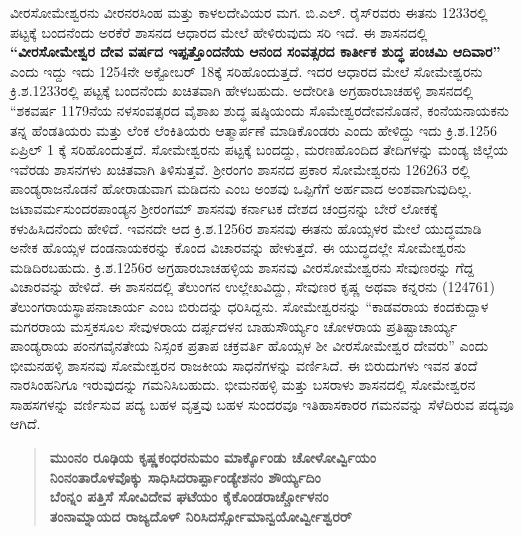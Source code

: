 ವೀರಸೋಮೇಶ್ವರನು ವೀರನರಸಿಂಹ ಮತ್ತು ಕಾಳಲದೇವಿಯರ ಮಗ. ಬಿ.ಎಲ್​. ರೈಸ್​ರವರು ಈತನು 1233ರಲ್ಲಿ ಪಟ್ಟಕ್ಕೆ ಬಂದನೆಂದು ಅರಕೆರೆ ಶಾಸನದ ಆಧಾರದ ಮೇಲೆ ಹೇಳಿರುವುದು ಸರಿ ಇದೆ. ಈ ಶಾಸನದಲ್ಲಿ \textbf{“ವೀರಸೋಮೇಶ್ವರ ದೇವ ವರ್ಷದ ಇಪ್ಪತ್ತೊಂದನೆಯ ಆನಂದ ಸಂವತ್ಸರದ ಕಾರ್ತೀಕ ಶುದ್ಧ ಪಂಚಮಿ ಆದಿವಾರ”} ಎಂದು ಇದ್ದು ಇದು 1254ನೇ ಅಕ್ಟೋಬರ್​ 18ಕ್ಕೆ ಸರಿಹೊಂದುತ್ತದೆ. ಇದರ ಆಧಾರದ ಮೇಲೆ ಸೋಮೇಶ್ವರನು ಕ್ರಿ.ಶ.1233ರಲ್ಲಿ ಪಟ್ಟಕ್ಕೆ ಬಂದನೆಂದು ಖಚಿತವಾಗಿ ಹೇಳಬಹುದು. ಅದೇರೀತಿ ಅಗ್ರಹಾರಬಾಚಹಳ್ಳಿ ಶಾಸನದಲ್ಲಿ “ಶಕವರ್ಷ 1179ನೆಯ ನಳಸಂವತ್ಸರದ ವೈಶಾಖ ಶುದ್ಧ ಷಷ್ಠಿಯಂದು ಸೊಮೇಶ್ವರದೇವನೊಡನೆ, ಕಂನೆಯನಾಯಕನು ತನ್ನ ಹೆಂಡತಿಯರು ಮತ್ತು ಲೆಂಕ ಲೆಂಕಿತಿಯರು ಆತ್ಮಾರ್ಪಣೆ ಮಾಡಿಕೊಂಡರು ಎಂದು ಹೇಳಿದ್ದು ಇದು ಕ್ರಿ.ಶ.1256 ಏಪ್ರಿಲ್​ 1 ಕ್ಕೆ ಸರಿಹೊಂದುತ್ತದೆ. ಸೋಮೇಶ್ವರನು ಪಟ್ಟಕ್ಕೆ ಬಂದದ್ದು, ಮರಣಹೊಂದಿದ ತೇದಿಗಳನ್ನು ಮಂಡ್ಯ ಜಿಲ್ಲೆಯ ಇವೆರಡು ಶಾಸನಗಳು ಖಚಿತವಾಗಿ ತಿಳಿಸುತ್ತವೆ. ಶ‍್ರೀರಂಗಂ ಶಾಸನದ ಪ್ರಕಾರ ಸೋಮೇಶ್ವರನು 126263 ರಲ್ಲಿ ಪಾಂಡ್ಯರಾಜನೊಡನೆ ಹೋರಾಡುವಾಗ ಮಡಿದನು ಎಂಬ ಅಂಶವು ಒಪ್ಪಿಗೆಗೆ ಅರ್ಹವಾದ ಅಂಶವಾಗುವುದಿಲ್ಲ. ಜಟಾವರ್ಮಸುಂದರಪಾಂಡ್ಯನ ಶ‍್ರೀರಂಗಮ್ ಶಾಸನವು ಕರ್ನಾಟಕ ದೇಶದ ಚಂದ್ರನನ್ನು ಬೇರೆ ಲೋಕಕ್ಕೆ ಕಳುಹಿಸಿದನೆಂದು ಹೇಳಿದೆ. ಇವನದೇ ಆದ ಕ್ರಿ.ಶ.1256ರ ಶಾಸನವು ಈತನು ಹೊಯ್ಸಳರ ಮೇಲೆ ಯುದ್ಧಮಾಡಿ ಅನೇಕ ಹೊಯ್ಸಳ ದಂಡನಾಯಕರನ್ನು ಕೊಂದ ವಿಚಾರವನ್ನು ಹೇಳುತ್ತದೆ. ಈ ಯುದ್ಧದಲ್ಲೇ ಸೋಮೇಶ್ವರನು ಮಡಿದಿರಬಹುದು. ಕ್ರಿ.ಶ.1256ರ ಅಗ್ರಹಾರಬಾಚಹಳ್ಳಿಯ ಶಾಸನವು ವೀರಸೋಮೇಶ್ವರನು ಸೇವುಣರನ್ನು ಗೆದ್ದ ವಿಚಾರವನ್ನು ಹೇಳಿದೆ. ಈ ಶಾಸನದಲ್ಲಿ ತೆಲುಂಗನ ಉಲ್ಲೇಖವಿದ್ದು, ಸೇವುಣರ ಕೃಷ್ಣ ಅಥವಾ ಕನ್ನರನು (124761) ತೆಲುಂಗರಾಯಸ್ಥಾಪನಾಚಾರ್ಯ ಎಂಬ ಬಿರುದನ್ನು ಧರಿಸಿದ್ದನು. ಸೋಮೇಶ್ವರನನ್ನು “ಕಾಡವರಾಯ ಕಂದಕುದ್ದಾಳ ಮಗರರಾಯ ಮಸ್ತಕಸೂಲ ಸೇವುಳರಾಯ ದರ್ಪ್ಪದಳನ ಬಾಹುಸೌರ್ಯ್ಯಂ ಚೋಳರಾಯ ಪ್ರತಿಷ್ಟಾಚಾರ್ಯ್ಯ ಪಾಂಡ್ಯರಾಯ ಪಂನಗವೈನತೇಯ ನಿಸ್ಸಂಕ ಪ್ರತಾಪ ಚಕ್ರವರ್ತಿ ಹೊಯ್ಸಳ ಶೀ ವೀರಸೋಮೇಶ್ವರ ದೇವರು” ಎಂದು ಭೀಮನಹಳ್ಳಿ ಶಾಸನವು ಸೋಮೇಶ್ವರನ ರಾಜಕೀಯ ಸಾಧನೆಗಳನ್ನು ವರ್ಣಿಸಿದೆ. ಈ ಬಿರುದುಗಳು ಇವನ ತಂದೆ ನಾರಸಿಂಹನಿಗೂ ಇರುವುದನ್ನು ಗಮನಿಸಿಬಹುದು. ಭೀಮನಹಳ್ಳಿ ಮತ್ತು ಬಸರಾಳು ಶಾಸನದಲ್ಲಿ ಸೋಮೇಶ್ವರನ ಸಾಹಸಗಳನ್ನು ವರ್ಣಿಸುವ ಪದ್ಯ ಬಹಳ ವೃತ್ತವು ಬಹಳ ಸುಂದರವೂ ಇತಿಹಾಸಕಾರರ ಗಮನವನ್ನು ಸೆಳೆದಿರುವ ಪದ್ಯವೂ ಆಗಿದೆ.

\begin{verse}
\textbf{ಮುಂನಂ ರೂಢಿಯ ಕೃಷ್ಣಕಂಧರನುಮಂ ಮಾರ್ಕ್ಕೊಂಡು ಚೋಳೋರ್ವ್ವಿಯಂ} \\\textbf{ನಿಂನಂತಾರೊಳವೊಕ್ಕು ಸಾಧಿಸಿದರಾರ್ಪ್ಪಾಂಡ್ಯೇಶನಂ ಶೌರ್ಯ್ಯದಿಂ} \\\textbf{ಬೆಂನ್ನಂ ಪತ್ತಿಸೆ ಸೋವಿದೇವ ಘಟೆಯಂ ಕೈಕೊಂಡರಾರ್ಚ್ಚೋಳನಂ} \\\textbf{ತಂನಾಮ್ನಾಯದ ರಾಜ್ಯದೊಳ್​ ನಿರಿಸಿದರ್ಸ್ಸೋಮಾನ್ವಯೋರ್ವ್ವೀಶ್ವರರ್​}
\end{verse}

